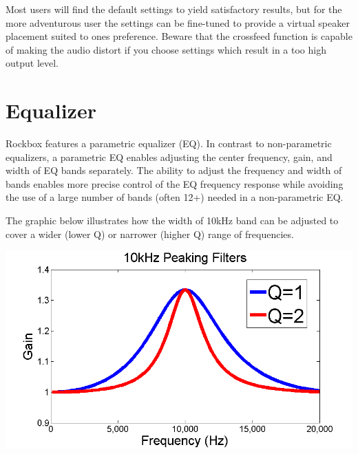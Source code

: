   Most users will find the default settings to yield satisfactory results, but
  for the more adventurous user the settings can be fine-tuned to provide a
  virtual speaker placement suited to ones preference.
  Beware that the crossfeed function is capable of making the audio distort
  if you choose settings which result in a too high output level.

\section{\label{ref:EQ}Equalizer}
  Rockbox features a parametric equalizer (EQ). In contrast to non-parametric
  equalizers, a parametric EQ enables adjusting the center frequency, gain, and
  width of EQ bands separately.  The ability to adjust the frequency and width
  of bands enables more precise control of the EQ frequency response while
  avoiding the use of a large number of bands (often 12+) needed in a
  non-parametric EQ.

  The graphic below illustrates how the width of 10kHz band can be adjusted to
  cover a wider (lower Q) or narrower (higher Q) range of frequencies.

  {\includegraphics{configure_rockbox/images/Q_factor.png}}

